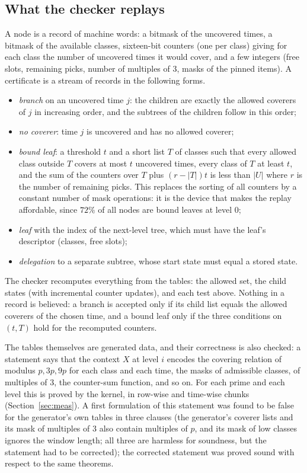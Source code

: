 \documentclass[11pt]{article}
\theoremstyle{remark}
\begin{document}
\subsection{What the checker replays}

A node is a record of machine words: a bitmask of the uncovered times, a bitmask of the available classes, sixteen-bit counters (one per class) giving for each class the number of uncovered times it would cover, and a few integers (free slots, remaining picks, number of multiples of $3$, masks of the pinned items). A certificate is a stream of records in the following forms.
\begin{itemize}
\item \emph{branch} on an uncovered time $j$: the children are exactly the allowed coverers of $j$ in increasing order, and the subtrees of the children follow in this order;
\item \emph{no coverer}: time $j$ is uncovered and has no allowed coverer;
\item \emph{bound leaf}: a threshold $t$ and a short list $T$ of classes such that every allowed class outside $T$ covers at most $t$ uncovered times, every class of $T$ at least $t$, and the sum of the counters over $T$ plus $(r-|T|)t$ is less than $|U|$ where $r$ is the number of remaining picks. This replaces the sorting of all counters by a constant number of mask operations: it is the device that makes the replay affordable, since $72\%$ of all nodes are bound leaves at level $0$;
\item \emph{leaf} with the index of the next-level tree, which must have the leaf's descriptor (classes, free slots);
\item \emph{delegation} to a separate subtree, whose start state must equal a stored state.
\end{itemize}
The checker recomputes everything from the tables: the allowed set, the child states (with incremental counter updates), and each test above. Nothing in a record is believed: a branch is accepted only if its child list equals the allowed coverers of the chosen time, and a bound leaf only if the three conditions on $(t,T)$ hold for the recomputed counters.

The tables themselves are generated data, and their correctness is also checked: a statement  says that the context $X$ at level $i$ encodes the covering relation of modulus $p,3p,9p$ for each class and each time, the masks of admissible classes, of multiples of $3$, the counter-sum function, and so on. For each prime and each level this is proved by the kernel, in row-wise and time-wise chunks (Section~\ref{sec:meas}). A first formulation of this statement was found to be false for the generator's own tables in three clauses (the generator's coverer lists and its mask of multiples of $3$ also contain multiples of $p$, and its mask of low classes ignores the window length; all three are harmless for soundness, but the statement had to be corrected); the corrected statement was proved sound with respect to the same theorems.
\end{document}
